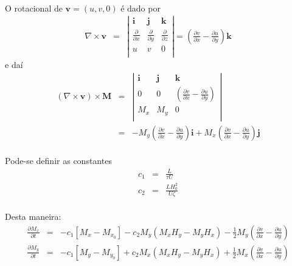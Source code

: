 \documentclass[eletromagnetismo.tex]{subfiles}
\begin{document}
\paragraph{} O rotacional de $\mathbf{v} = (u, v, 0)$ é dado por \begin{eqnarray}
	\nabla\times \mathbf{v} & = & \left|\begin{array}{ccc}
\mathbf{i} & \mathbf{j} & \mathbf{k}\\
\frac{\partial}{\partial x} & \frac{\partial}{\partial y} & \frac{\partial}{\partial z}\\
u & v & 0\\
\end{array}
\right| = \left(\frac{\partial v}{\partial x} - \frac{\partial u}{\partial y}\right)\mathbf{k}
\end{eqnarray} e daí \begin{eqnarray}
(\nabla\times \mathbf{v})\times \mathbf{M} & = & \left|\begin{array}{ccc}
\mathbf{i} & \mathbf{j} & \mathbf{k} \\
0 & 0 & 	\left(\frac{\partial v}{\partial x} - \frac{\partial u}{\partial y}\right)\\
M_x & M_y & 0\\
\end{array}
\right| \\
& =& -M_y\left(\frac{\partial v}{\partial x} - \frac{\partial u}{\partial y}\right)\mathbf{i} + M_x\left(\frac{\partial v}{\partial x} - \frac{\partial u}{\partial y}\right)\mathbf{j}
\end{eqnarray}


\paragraph{} Pode-se definir as constantes \begin{eqnarray}
c_1 & = & \frac{L}{\tau U}\\
c_2 & = & \frac{LH_0^2}{U\zeta}
\end{eqnarray}

\paragraph{} Desta maneira:
\begin{eqnarray}
\frac{\partial M_x}{\partial t} & = & -c_1[M_x - M_{x_0}]-c_2 M_y(M_x H_y - M_y H_x)-\frac{1}{2}M_y\left(\frac{\partial v}{\partial x} - \frac{\partial u}{\partial y}\right)\\
\frac{\partial M_y}{\partial t} & = & -c_1[M_y - M_{y_0}]+c_2 M_x(M_x H_y - M_y H_x)+\frac{1}{2}M_x\left(\frac{\partial v}{\partial x} - \frac{\partial u}{\partial y}\right)
\end{eqnarray}
\end{document}
